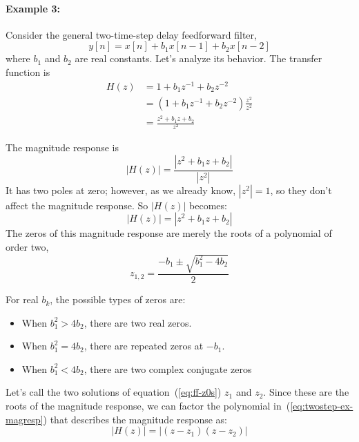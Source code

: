\paragraph*{Example 3:}

Consider the general two-time-step delay feedforward filter,
\begin{equation*}
y[n] = x[n] + b_1 x[n-1] + b_2 x[n-2]
\end{equation*}
where $b_1$ and $b_2$ are real constants. Let's analyze its
behavior. The transfer function is
\begin{align*}
H(z) &= 1 + b_1 z^{-1} + b_2 z^{-2} \\
     &= (1 + b_1 z^{-1} + b_2 z^{-2}) \frac{z^2}{z^2} \\
     &= \frac{z^2 + b_1 z + b_2}{z^2}
\end{align*}

The magnitude response is
\begin{equation}
|H(z)| = \frac{|z^2 + b_1 z + b_2|}{|z^2|} \label{eq:twostep-ex}
\end{equation}
It has two poles at zero; however, as we already know, $|z^2|=1$, so
they don't affect the magnitude response. So $|H(z)|$ becomes:
\begin{equation}
|H(z)|=|z^2 + b_1 z + b_2| \label{eq:twostep-ex-magresp}
\end{equation}
The zeros of this magnitude response are merely the roots of a
polynomial of order two,
\begin{equation}
z_{1,2} = \frac{-b_1 \pm \sqrt{b_1^2 - 4 b_2}}{2}
\label{eq:ff-z0s}
\end{equation}

For real $b_k$, the possible types of zeros are:
\begin{itemize}
\item When $b_1^2 > 4b_2$, there are two real zeros.
\item When $b_1^2 = 4b_2$, there are repeated zeros at $-b_1$.
\item When $b_1^2 < 4b_2$, there are two complex conjugate zeros
\end{itemize}
Let's call the two solutions of equation~(\ref{eq:ff-z0s}) $z_1$ and
$z_2$.  Since these are the roots of the magnitude response, we can
factor the polynomial in~(\ref{eq:twostep-ex-magresp}) that describes
the magnitude response as:
\begin{equation}
|H(z)| = |(z - z_1)(z - z_2)| \label{eq:twostep-factored}
\end{equation}

